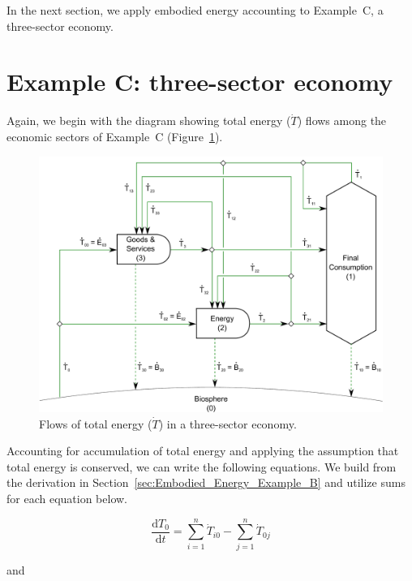 In the next section, we apply embodied energy accounting to 
Example~C, a three-sector economy.


\section{Example C: three-sector economy} %
\label{sec:Embodied_Energy_Example_C}

Again, we begin with the diagram showing total energy ($\dot{T}$) flows
among the economic sectors of Example~C (Figure~\ref{fig:C_total_energy}).

\begin{figure}[!ht]
\includegraphics[width=1.0\linewidth]{Part_1/Chapter_Embodied/images/3_sector_embodied_energy.pdf}
\caption[Flows of total energy in a three-sector economy.]{Flows of total energy ($\dot{T}$) in a three-sector economy.}
\label{fig:C_total_energy}
\end{figure}

Accounting for accumulation of total energy and 
applying the assumption that total energy is conserved, 
we can write the following equations.
We build from the derivation in Section~\ref{sec:Embodied_Energy_Example_B}
and utilize sums for each equation below.

\begin{equation} \label{eq:C-CV_T_0}
	\frac{\mathrm{d}T_{0}}{\mathrm{d}t} 	 
	= \sum\limits_{i=1}^{n} \dot{T}_{i0}
	- \sum\limits_{j=1}^{n} \dot{T}_{0j}
\end{equation}

\noindent and

